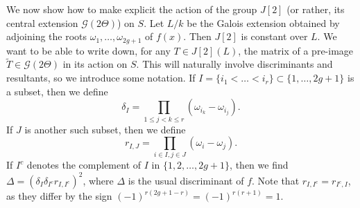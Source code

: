 \documentclass{article} %
\numberwithin{equation}{section}
\begin{document}
We now show how to make explicit the action of the group $J[2]$ (or rather, its central extension $\mathcal{G}(2 \Theta)$) on $S$. Let $L / k$ be the Galois extension obtained by adjoining the roots $\omega_1, \dots, \omega_{2g+1}$ of $f(x)$. Then $J[2]$ is constant over $L$. We want to be able to write down, for any $T \in J[2](L)$, the matrix of a pre-image $\widetilde{T} \in \mathcal{G}(2 \Theta)$ in its action on $S$. This will naturally involve discriminants and resultants, so we introduce some notation. If $I = \{ i_1 < \dots < i_r \} \subset \{ 1, \dots, 2g+1 \}$ is a subset, then we define \begin{equation}\label{eqn_half_discriminant} \delta_I = \prod_{1 \leq j < k \leq r} (\omega_{i_k} - \omega_{i_j}).
\end{equation}
If $J$ is another such subset, then we define 
\begin{equation}\label{eqn_resultant} 
r_{I, J} = \prod_{i \in I, j \in J} (\omega_i - \omega_j). 
\end{equation}
If $I^c$ denotes the complement of $I$ in $\{ 1, 2, \dots, 2g+1 \}$, then we find $\Delta = (\delta_I \delta_{I^c} r_{I, I^c})^2$, where $\Delta$ is the usual discriminant of $f$. Note that $r_{I, I^c} = r_{I^c, I}$, as they differ by the sign $(-1)^{r(2g+1-r)} = (-1)^{r(r+1)} = 1$.
\end{document}
